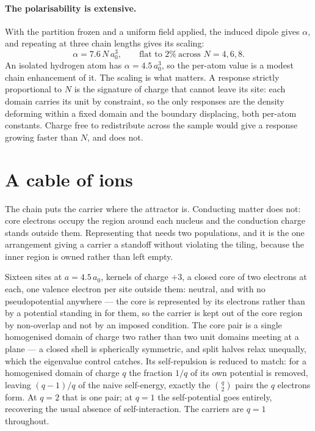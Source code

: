 \documentclass[11pt]{article}
\begin{document}
\paragraph{The polarisability is extensive.} With the partition frozen and a uniform field applied,
the induced dipole gives $\alpha$, and repeating at three chain lengths gives its scaling:
\[
\alpha = 7.6\,N\,a_0^3,\qquad\text{flat to } 2\%\ \text{across } N=4,6,8 .
\]
An isolated hydrogen atom has $\alpha=4.5\,a_0^3$, so the per-atom value is a modest chain
enhancement of it. The scaling is what matters. A response strictly proportional to $N$ is the
signature of charge that cannot leave its site: each domain carries its unit by constraint, so the
only responses are the density deforming within a fixed domain and the boundary displacing, both
per-atom constants. Charge free to redistribute across the sample would give a response growing
faster than $N$, and does not.

\section{A cable of ions}

The chain puts the carrier where the attractor is. Conducting matter does not: core electrons
occupy the region around each nucleus and the conduction charge stands outside them. Representing
that needs two populations, and it is the one arrangement giving a carrier a standoff without
violating the tiling, because the inner region is owned rather than left empty.

Sixteen sites at $a=4.5\,a_0$, kernels of charge $+3$, a closed core of two electrons at each, one
valence electron per site outside them: neutral, and with no pseudopotential anywhere --- the core
is represented by its electrons rather than by a potential standing in for them, so the carrier is
kept out of the core region by non-overlap and not by an imposed condition. The core pair is a single
homogenised domain of charge two rather than two unit domains meeting at a plane --- a closed shell
is spherically symmetric, and split halves relax unequally, which the eigenvalue control catches.
Its self-repulsion is reduced to match: for a homogenised domain of charge $q$ the fraction $1/q$ of
its own potential is removed, leaving $(q-1)/q$ of the naive self-energy, exactly the
$\binom{q}{2}$ pairs the $q$ electrons form. At $q=2$ that is one pair; at $q=1$ the self-potential
goes entirely, recovering the usual absence of self-interaction. The carriers are $q=1$ throughout.
\end{document}
